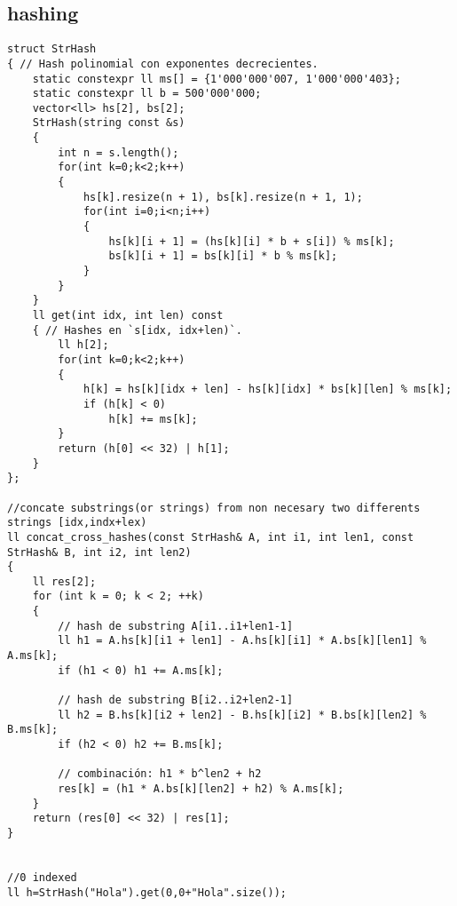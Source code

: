 \subsection*{hashing}
\begin{lstlisting}
struct StrHash
{ // Hash polinomial con exponentes decrecientes.
    static constexpr ll ms[] = {1'000'000'007, 1'000'000'403};
    static constexpr ll b = 500'000'000;
    vector<ll> hs[2], bs[2];
    StrHash(string const &s)
    {
        int n = s.length();
        for(int k=0;k<2;k++)
        {
            hs[k].resize(n + 1), bs[k].resize(n + 1, 1);
            for(int i=0;i<n;i++)
            {
                hs[k][i + 1] = (hs[k][i] * b + s[i]) % ms[k];
                bs[k][i + 1] = bs[k][i] * b % ms[k];
            }
        }
    }
    ll get(int idx, int len) const
    { // Hashes en `s[idx, idx+len)`.
        ll h[2];
        for(int k=0;k<2;k++)
        {
            h[k] = hs[k][idx + len] - hs[k][idx] * bs[k][len] % ms[k];
            if (h[k] < 0)
                h[k] += ms[k];
        }
        return (h[0] << 32) | h[1];
    }
};

//concate substrings(or strings) from non necesary two differents strings [idx,indx+lex)
ll concat_cross_hashes(const StrHash& A, int i1, int len1, const StrHash& B, int i2, int len2)
{
    ll res[2];
    for (int k = 0; k < 2; ++k)
    {
        // hash de substring A[i1..i1+len1-1]
        ll h1 = A.hs[k][i1 + len1] - A.hs[k][i1] * A.bs[k][len1] % A.ms[k];
        if (h1 < 0) h1 += A.ms[k];

        // hash de substring B[i2..i2+len2-1]
        ll h2 = B.hs[k][i2 + len2] - B.hs[k][i2] * B.bs[k][len2] % B.ms[k];
        if (h2 < 0) h2 += B.ms[k];

        // combinación: h1 * b^len2 + h2
        res[k] = (h1 * A.bs[k][len2] + h2) % A.ms[k];
    }
    return (res[0] << 32) | res[1];
}


//0 indexed
ll h=StrHash("Hola").get(0,0+"Hola".size());
\end{lstlisting}

